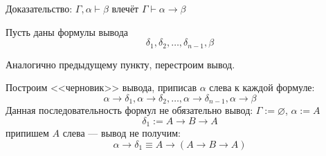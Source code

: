 \documentclass[aspectratio=169]{beamer}
\begin{document}
\begin{frame}{Доказательство: $\Gamma,\alpha\vdash\beta$ влечёт $\Gamma\vdash\alpha\rightarrow\beta$}

Пусть даны формулы вывода $$\delta_1,\delta_2,\dots,\delta_{n-1},\beta$$

Аналогично предыдущему пункту, перестроим вывод.\pause

Построим <<черновик>> вывода, приписав $\alpha$ слева к каждой формуле:
$$\alpha\rightarrow\delta_1,\alpha\rightarrow\delta_2,\dots,\alpha\rightarrow\delta_{n-1},\alpha\rightarrow\beta$$\pause
Данная последовательность формул не обязательно вывод: $\Gamma:=\varnothing$, $\alpha := A$
$$\delta_1 := A\rightarrow B\rightarrow A$$\pause
припишем $A$ слева --- вывод не получим:
$$\alpha\rightarrow\delta_1 \equiv A \rightarrow (A\rightarrow B\rightarrow A)$$
\end{frame}






\end{document}
